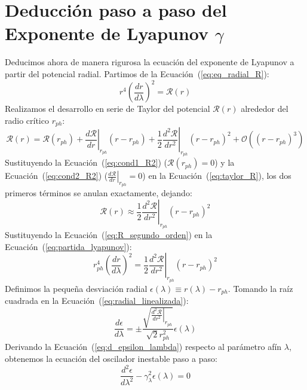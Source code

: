 \section{Deducción paso a paso del Exponente de Lyapunov \texorpdfstring{$\gamma$}{gamma}}
Deducimos ahora de manera rigurosa la ecuación del exponente de Lyapunov a partir del potencial radial.
Partimos de la Ecuación~(\ref{eq:eq_radial_R}):
\begin{equation}
    r^4 \left(\frac{dr}{d\lambda}\right)^2 = \mathcal{R}(r)
    \label{eq:partida_lyapunov}
\end{equation}
Realizamos el desarrollo en serie de Taylor del potencial $\mathcal{R}(r)$ alrededor del radio crítico $r_{ph}$:
\begin{equation}
    \mathcal{R}(r) = \mathcal{R}(r_{ph}) + \left.\frac{d\mathcal{R}}{dr}\right|_{r_{ph}} (r - r_{ph}) + \frac{1}{2}\left.\frac{d^2\mathcal{R}}{dr^2}\right|_{r_{ph}} (r - r_{ph})^2 + \mathcal{O}\left((r - r_{ph})^3\right)
    \label{eq:taylor_R}
\end{equation}
Sustituyendo la Ecuación~(\ref{eq:cond1_R2}) ($\mathcal{R}(r_{ph}) = 0$) y la Ecuación~(\ref{eq:cond2_R2}) ($\left.\frac{d\mathcal{R}}{dr}\right|_{r_{ph}} = 0$) en la Ecuación~(\ref{eq:taylor_R}), los dos primeros términos se anulan exactamente, dejando:
\begin{equation}
    \mathcal{R}(r) \approx \frac{1}{2}\left.\frac{d^2\mathcal{R}}{dr^2}\right|_{r_{ph}} (r - r_{ph})^2
    \label{eq:R_segundo_orden}
\end{equation}
Sustituyendo la Ecuación~(\ref{eq:R_segundo_orden}) en la Ecuación~(\ref{eq:partida_lyapunov}):
\begin{equation}
    r_{ph}^4 \left(\frac{dr}{d\lambda}\right)^2 = \frac{1}{2}\left.\frac{d^2\mathcal{R}}{dr^2}\right|_{r_{ph}} (r - r_{ph})^2
    \label{eq:radial_linealizada}
\end{equation}
Definimos la pequeña desviación radial $\epsilon(\lambda) \equiv r(\lambda) - r_{ph}$. Tomando la raíz cuadrada en la Ecuación~(\ref{eq:radial_linealizada}):
\begin{equation}
    \frac{d\epsilon}{d\lambda} = \pm \frac{\sqrt{\left.\frac{d^2\mathcal{R}}{dr^2}\right|_{r_{ph}}}}{\sqrt{2} r_{ph}^2} \epsilon(\lambda)
    \label{eq:d_epsilon_lambda}
\end{equation}
Derivando la Ecuación~(\ref{eq:d_epsilon_lambda}) respecto al parámetro afín $\lambda$, obtenemos la ecuación del oscilador inestable paso a paso:
\begin{equation}
    \frac{d^2\epsilon}{d\lambda^2} - \gamma_\lambda^2 \epsilon(\lambda) = 0
    \label{eq:oscilador_inestable_SI}
\end{equation}
